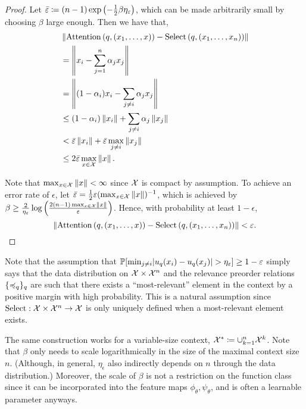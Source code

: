 \begin{proof}
    Let $\bar{\varepsilon} \coloneq (n-1) \exp\left(- \frac{1}{2} \beta \eta_{\varepsilon}\right)$, which can be made arbitrarily small by choosing $\beta$ large enough. Then we have that,
    \begin{align*}
        &\norm{\mathrm{Attention}\paren{q, (x_1, \ldots, x)} - \mathrm{Select}\paren{q, (x_1, \ldots, x_n)}} \\
        &= \norm{x_i - \sum_{j=1}^n{\alpha_j} x_j} \\
        &= \norm{(1 - \alpha_i) x_i - \sum_{j\neq i} {\alpha_j} x_j} \\
        &\leq (1 - \alpha_i)  \norm{x_i} + \sum_{j \neq i} \alpha_j \norm{x_j}\\
        &< \bar{\epsilon} \norm{x_i} + \bar{\epsilon}     \max_{j \neq i}\norm{x_j} \\
        &\leq 2 \bar{\epsilon} \max_{x \in \calX} \norm{x}.
    \end{align*}

    Note that $\max_{x \in {\mathcal{X}}} \left\lVert x\right\rVert < \infty$ since ${\mathcal{X}}$ is compact by assumption. To achieve an error rate of $\epsilon$, let $\bar{\varepsilon} = \frac{1}{2} \varepsilon (\max_{x \in {\mathcal{X}}} \left\lVert x\right\rVert)^{-1}$, which is achieved by $\beta \geq \frac{2}{\eta_\varepsilon} \log\left(\frac{2 (n-1) \max_{x \in {\mathcal{X}}} \left\lVert x\right\rVert}{\varepsilon}\right)$. Hence, with probability at least $1 - \epsilon$,
    \begin{equation*}
        \norm{\mathrm{Attention}\paren{q, (x_1, \ldots, x)} - \mathrm{Select}\paren{q, (x_1, \ldots, x_n)}} < \epsilon.
    \end{equation*}
\end{proof}


\begin{remark}
    Note that the assumption that $\mathbb{P}[\min_{j \neq i} \lvert u_q(x_i) - u_q(x_j)\rvert > \eta_\varepsilon] \geq 1 - \varepsilon$ simply says that the data distribution on ${\mathcal{X}} \times {\mathcal{X}}^n$ and the relevance preorder relations $\{\preccurlyeq_q\}_q$ are such that there exists a ``most-relevant'' element in the context by a positive margin with high probability. This is a natural assumption since $\mathrm{Select}: {\mathcal{X}} \times {\mathcal{X}}^n \to {\mathcal{X}}$ is only uniquely defined when a most-relevant element exists.
\end{remark}

\begin{remark}
    The same construction works for a variable-size context, ${\mathcal{X}}^* \coloneq \cup_{k=1}^n {\mathcal{X}}^k$. Note that $\beta$ only needs to scale logarithmically in the size of the maximal context size $n$. (Although, in general, $\eta_\epsilon$ also indirectly depends on $n$ through the data distribution.) Moreover, the scale of $\beta$ is not a restriction on the function class since it can be incorporated into the feature maps $\phi_\theta, \psi_\theta$, and is often a learnable parameter anyways.
\end{remark}